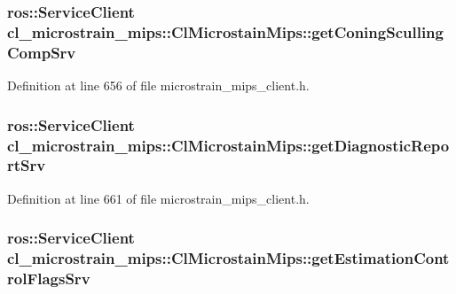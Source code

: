 \subsubsection[{\texorpdfstring{get\+Coning\+Sculling\+Comp\+Srv}{getConingScullingCompSrv}}]{\setlength{\rightskip}{0pt plus 5cm}ros\+::\+Service\+Client cl\+\_\+microstrain\+\_\+mips\+::\+Cl\+Microstain\+Mips\+::get\+Coning\+Sculling\+Comp\+Srv\hspace{0.3cm}{\ttfamily [protected]}}\hypertarget{classcl__microstrain__mips_1_1ClMicrostainMips_a877393b5cf4c313e0e433e9c92163265}{}\label{classcl__microstrain__mips_1_1ClMicrostainMips_a877393b5cf4c313e0e433e9c92163265}


Definition at line 656 of file microstrain\+\_\+mips\+\_\+client.\+h.

\subsubsection[{\texorpdfstring{get\+Diagnostic\+Report\+Srv}{getDiagnosticReportSrv}}]{\setlength{\rightskip}{0pt plus 5cm}ros\+::\+Service\+Client cl\+\_\+microstrain\+\_\+mips\+::\+Cl\+Microstain\+Mips\+::get\+Diagnostic\+Report\+Srv\hspace{0.3cm}{\ttfamily [protected]}}\hypertarget{classcl__microstrain__mips_1_1ClMicrostainMips_a3d4329c798aa4b7cab1320f35f270192}{}\label{classcl__microstrain__mips_1_1ClMicrostainMips_a3d4329c798aa4b7cab1320f35f270192}


Definition at line 661 of file microstrain\+\_\+mips\+\_\+client.\+h.

\subsubsection[{\texorpdfstring{get\+Estimation\+Control\+Flags\+Srv}{getEstimationControlFlagsSrv}}]{\setlength{\rightskip}{0pt plus 5cm}ros\+::\+Service\+Client cl\+\_\+microstrain\+\_\+mips\+::\+Cl\+Microstain\+Mips\+::get\+Estimation\+Control\+Flags\+Srv\hspace{0.3cm}{\ttfamily [protected]}}\hypertarget{classcl__microstrain__mips_1_1ClMicrostainMips_a64039ee26cf8a290b3c22b787b8868a5}{}\label{classcl__microstrain__mips_1_1ClMicrostainMips_a64039ee26cf8a290b3c22b787b8868a5}


